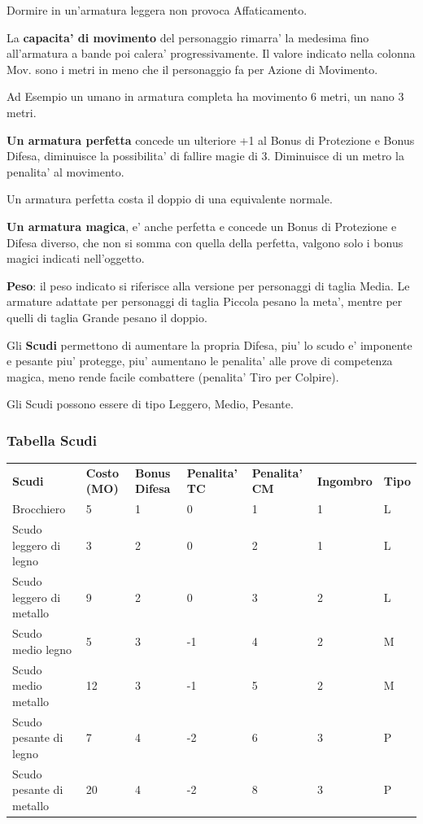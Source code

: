 \documentclass[a4paper,11pt,twoside,openany]{book}
\begin{document}
{		Dormire in un'armatura leggera non provoca Affaticamento.
		
		La \textbf{capacita' di movimento} del personaggio rimarra' la medesima fino all'armatura a bande poi calera' progressivamente. Il valore indicato nella colonna Mov. sono i metri in meno che il personaggio fa per Azione di Movimento.
		
		Ad Esempio un umano in armatura completa ha movimento 6 metri, un nano 3 metri. 
		
		\textbf{Un armatura perfetta} concede un ulteriore +1 al Bonus di Protezione e Bonus Difesa, diminuisce la possibilita' di fallire magie di 3. Diminuisce di un metro la penalita' al movimento. 
		
		Un armatura perfetta costa il doppio di una equivalente normale.
		
		\textbf{Un armatura magica}, e' anche perfetta e concede un Bonus di Protezione e Difesa diverso, che non si somma con quella della perfetta, valgono solo i bonus magici indicati nell'oggetto.
		
		\textbf{Peso}: il peso indicato si riferisce alla versione per personaggi di taglia Media. Le armature adattate per personaggi di taglia Piccola pesano la meta', mentre per quelli di taglia Grande pesano il doppio.
		
		\pagebreak
		
		Gli \textbf{Scudi} permettono di aumentare la propria Difesa, piu' lo scudo e' imponente e pesante piu' protegge, piu' aumentano le penalita' alle prove di competenza magica, meno rende facile combattere (penalita' Tiro per Colpire).
		
		Gli Scudi possono essere di tipo Leggero, Medio, Pesante.
		
		\subsubsection{Tabella Scudi}
		
		\label{tabella-scudi}
		\medskip
		\begin{tabular}{lllllll}
			\toprule
			\textbf{Scudi} & \textbf{Costo (MO)} & \textbf{Bonus Difesa} & \textbf{Penalita' TC} & \textbf{Penalita' CM} & \textbf{Ingombro} & \textbf{Tipo}\tabularnewline
			Brocchiero & 5 & 1 & 0 & 1 & 1 &L\tabularnewline
			Scudo leggero di legno & 3 & 2 & 0 & 2 & 1 &L\tabularnewline
			Scudo leggero di metallo & 9 & 2 & 0 & 3 & 2 &L\tabularnewline
			Scudo medio legno & 5 & 3 & -1 & 4 & 2 &M\tabularnewline
			Scudo medio metallo & 12 & 3 & -1 & 5 & 2 &M\tabularnewline
			Scudo pesante di legno & 7 & 4 & -2 & 6 & 3 &P\tabularnewline
			Scudo pesante di metallo & 20 & 4 & -2 & 8 & 3 & P\tabularnewline
		\end{tabular}
		
}
\end{document}
